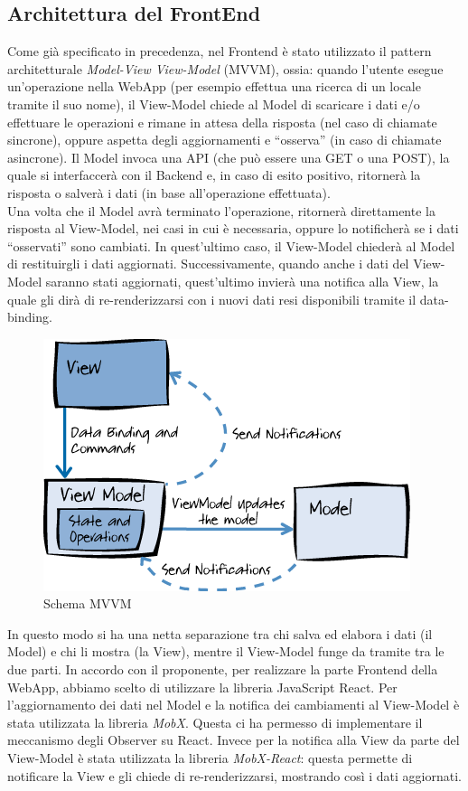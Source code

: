 \subsection{Architettura del FrontEnd}

Come già specificato in precedenza, nel Frontend è stato utilizzato il pattern architetturale \textit{Model-View View-Model} (MVVM), ossia: quando l’utente esegue un’operazione nella WebApp (per esempio effettua una ricerca di un locale tramite il suo nome), il View-Model chiede al Model di scaricare i dati e/o effettuare le operazioni e rimane in attesa della risposta (nel caso di chiamate sincrone), oppure aspetta degli aggiornamenti e “osserva” (in caso di chiamate asincrone). Il Model invoca una API (che può essere una GET o una POST), la quale si interfaccerà con il Backend e, in caso di esito positivo, ritornerà la risposta o salverà i dati (in base all'operazione effettuata). \\
Una volta che il Model avrà terminato l'operazione, ritornerà direttamente la risposta al View-Model, nei casi in cui è necessaria, oppure lo notificherà se i dati “osservati” sono cambiati. In quest'ultimo caso, il View-Model chiederà al Model di restituirgli i dati aggiornati. Successivamente, quando anche i dati del View-Model saranno stati aggiornati, quest'ultimo invierà una notifica alla View, la quale gli dirà di re-renderizzarsi con i nuovi dati resi disponibili tramite il data-binding. 

\begin{figure}[H]
    \centering
    \includegraphics[scale=0.5]{Contenuto/Immagini/MVVM.png}
    \caption{Schema MVVM}
\end{figure}

In questo modo si ha una netta separazione tra chi salva ed elabora i dati (il Model) e chi li mostra (la View), mentre il View-Model funge da tramite tra le due parti. 
In accordo con il proponente, per realizzare la parte Frontend della WebApp, abbiamo scelto di utilizzare la libreria JavaScript React. Per l'aggiornamento dei dati nel Model e la notifica dei cambiamenti al View-Model è stata utilizzata la libreria \textit{MobX}. Questa ci ha permesso di implementare il meccanismo degli Observer su React. 
Invece per la notifica alla View da parte del View-Model è stata utilizzata la libreria \textit{MobX-React}: questa permette di notificare la View e gli chiede di re-renderizzarsi, mostrando così i dati aggiornati.




